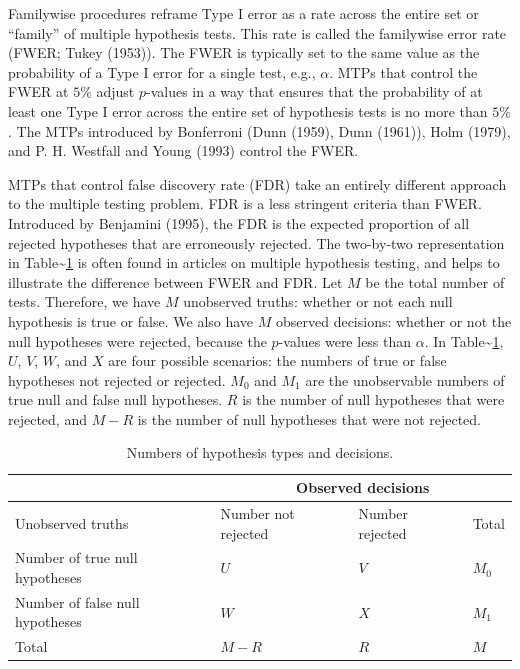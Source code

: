\documentclass[
]{article}
\begin{document}
Familywise procedures reframe Type I error as a rate across the entire
set or ``family'' of multiple hypothesis tests. This rate is called the
familywise error rate (FWER; Tukey (1953)). The FWER is typically set to
the same value as the probability of a Type I error for a single test,
e.g., \(\alpha\). MTPs that control the FWER at \(5\%\) adjust
\(p\)-values in a way that ensures that the probability of at least one
Type I error across the entire set of hypothesis tests is no more than
\(5\%\). The MTPs introduced by Bonferroni (Dunn (1959), Dunn (1961)),
Holm (1979), and P. H. Westfall and Young (1993) control the FWER.

MTPs that control false discovery rate (FDR) take an entirely different
approach to the multiple testing problem. FDR is a less stringent
criteria than FWER. Introduced by Benjamini (1995), the FDR is the
expected proportion of all rejected hypotheses that are erroneously
rejected. The two-by-two representation in
Table\textasciitilde{}\ref{tab:twobytwo} is often found in articles on
multiple hypothesis testing, and helps to illustrate the difference
between FWER and FDR. Let \(M\) be the total number of tests. Therefore,
we have \(M\) unobserved truths: whether or not each null hypothesis is
true or false. We also have \(M\) observed decisions: whether or not the
null hypotheses were rejected, because the \(p\)-values were less than
\(\alpha\). In Table\textasciitilde{}\ref{tab:twobytwo}, \(U\), \(V\),
\(W\), and \(X\) are four possible scenarios: the numbers of true or
false hypotheses not rejected or rejected. \(M_0\) and \(M_1\) are the
unobservable numbers of true null and false null hypotheses. \(R\) is
the number of null hypotheses that were rejected, and \(M - R\) is the
number of null hypotheses that were not rejected.

\begin{table}[h!]
\centering
\begin{tabular}{l l l l}
                                      & \multicolumn{3}{c}{Observed decisions}\\ \hline
Unobserved truths                     & Number not rejected     & Number rejected   & Total \\ \hline
Number of true null hypotheses        & $U$                     & $V$               & $M_0$ \\
Number of false null hypotheses       & $W$                     & $X$               & $M_1$ \\ \hline
Total                                 & $M-R$                   & $R$               & $M$
\end{tabular}
\caption{Numbers of hypothesis types and decisions.}
  \label{tab:twobytwo}
\end{table}
\end{document}
